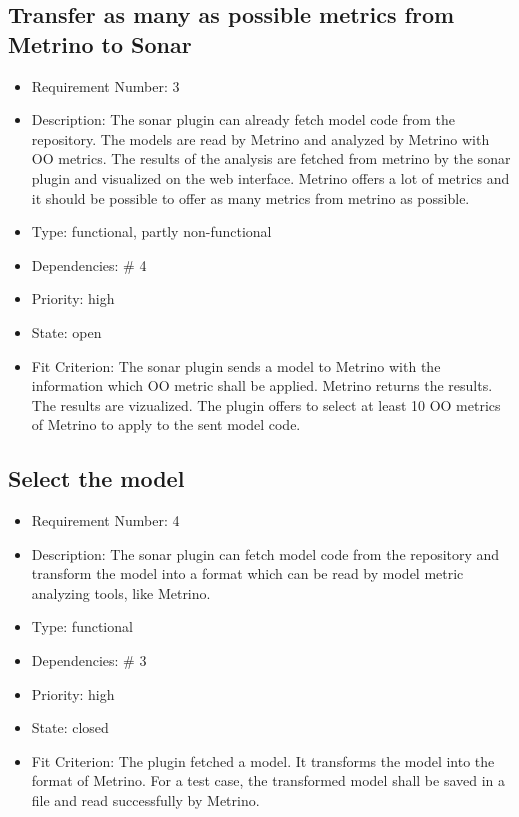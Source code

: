 \subsection{Transfer as many as possible metrics from Metrino to Sonar}
\begin{itemize}
\item Requirement Number: 3
\item Description: The sonar plugin can already fetch model code from the repository. The models are read by Metrino and analyzed by Metrino with OO metrics. The results of the analysis are fetched from metrino by the sonar plugin and visualized on the web interface. Metrino offers a lot of metrics and it should be possible to offer as many metrics from metrino as possible.
\item Type: functional, partly non-functional
\item Dependencies: \# 4
\item Priority: high
\item State: open
\item Fit Criterion: The sonar plugin sends a model to Metrino with the information which OO metric shall be applied. Metrino returns the results. The results are vizualized. The plugin offers to select at least 10 OO metrics of Metrino to apply to the sent model code.
\end{itemize}

\subsection{Select the model}
\begin{itemize}
\item Requirement Number: 4
\item Description: The sonar plugin can fetch model code from the repository and transform the model into a format which can be read by model metric analyzing tools, like Metrino.
\item Type: functional
\item Dependencies: \# 3
\item Priority: high
\item State: closed
\item Fit Criterion: The plugin fetched a model. It transforms the model into the format of Metrino. For a test case, the transformed model shall be saved in a file and read successfully by Metrino.
\end{itemize}


